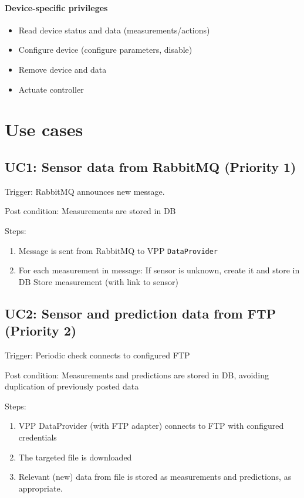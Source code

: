 \paragraph{Device-specific privileges}
\begin{itemize}
    \item{Read device status and data (measurements/actions)}
    \item{Configure device (configure parameters, disable)}
    \item{Remove device and data}
    \item{Actuate controller}
\end{itemize}

\newpage
\section{Use cases}

\subsection*{UC1: Sensor data from RabbitMQ (Priority 1)}\label{uc1}
\noindent Trigger: RabbitMQ announces new message.

\noindent Post condition: Measurements are stored in DB

\noindent Steps: 
\begin{enumerate}
    \item Message is sent from RabbitMQ to VPP \texttt{DataProvider}
    \item For each measurement in message:
        \subitem If sensor is unknown, create it and store in DB
        \subitem Store measurement (with link to sensor)
\end{enumerate}


\subsection*{UC2: Sensor and prediction data from FTP (Priority 2)}
\noindent Trigger: Periodic check connects to configured FTP

\noindent Post condition: Measurements and predictions are stored in DB, avoiding duplication of previously posted data

\noindent Steps: 
\begin{enumerate}
    \item VPP DataProvider (with FTP adapter) connects to FTP with configured credentials
    \item The targeted file is downloaded
    \item Relevant (new) data from file is stored as measurements and predictions, as appropriate.
\end{enumerate}

